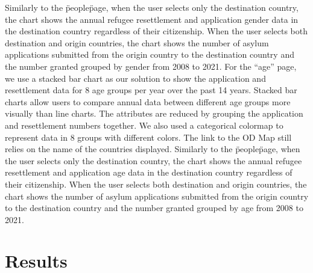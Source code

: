 \documentclass[journal]{vgtc}                %
\begin{document}
 Similarly to the \"people\" page, when the user selects only the destination country, the chart shows the annual refugee resettlement and application gender data in the destination country regardless of their citizenship. When the user selects both destination and origin countries, the chart shows the number of asylum applications submitted from the origin country to the destination country and the number granted grouped by gender from 2008 to 2021.
 For the “age” page, we use a stacked bar chart as our solution to show the application and resettlement data for 8 age groups per year over the past 14 years. Stacked bar charts allow users to compare annual data between different age groups more visually than line charts. The attributes are reduced by grouping the application and resettlement numbers together. We also used a categorical colormap to represent data in 8 groups with different colors. The link to the OD Map still relies on the name of the countries displayed.
 Similarly to the \"people\" page, when the user selects only the destination country, the chart shows the annual refugee resettlement and application age data in the destination country regardless of their citizenship. When the user selects both destination and origin countries, the chart shows the number of asylum applications submitted from the origin country to the destination country and the number granted grouped by age from 2008 to 2021.
 \section{Results}
\end{document}
